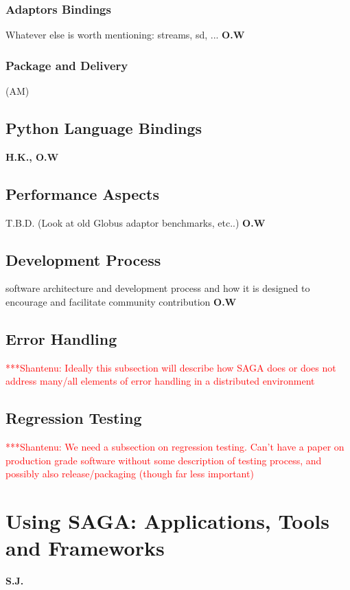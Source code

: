\documentclass[a4paper,10pt]{article}
\newcommand{\jhanote}[1]{  {\textcolor{red}     { ***Shantenu: #1 }}}
\newcommand{\jhanote}[1]{}
\begin{document}


 \subsubsection{Adaptors Bindings}
 Whatever else is worth mentioning: streams, sd, ... \textbf{O.W}


 \subsubsection{Package and Delivery} (AM)

 \subsection{Python Language Bindings}
 \textbf{H.K., O.W}
 
 
 \subsection{Performance Aspects}
 T.B.D. (Look at old Globus adaptor benchmarks, etc..) \textbf{O.W}

 \subsection{Development Process}
 software architecture and development process and how it is designed to encourage and facilitate community contribution \textbf{O.W}

\subsection{Error Handling}

\jhanote{Ideally this subsection will describe how SAGA does or does
  not address many/all elements of error handling in a distributed
  environment}

\subsection{Regression Testing}
\jhanote{We need a subsection on regression testing. Can't have a
  paper on production grade software without some description of
  testing process, and possibly also release/packaging (though far
  less important)}

\section{Using SAGA: Applications, Tools and Frameworks} \textbf{S.J.}
\end{document}
